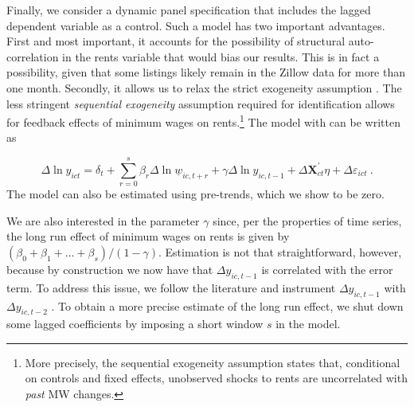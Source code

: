 
Finally, we consider a dynamic panel specification that includes the lagged dependent variable 
as a control. Such a model has two important advantages. First and most important, it accounts 
for the possibility of structural auto-correlation in the rents variable that would bias our results. This 
is in fact a possibility, given that some listings likely remain in the Zillow data for more 
than one month. Secondly, it allows us to relax the strict exogeneity assumption 
\parencite{ArellanoHonore2001}. The less stringent \textit{sequential exogeneity} assumption 
required for identification allows for feedback effects of minimum wages on rents.\footnote{More 
	precisely, the sequential exogeneity assumption states that, conditional on controls and 
	fixed 	effects, unobserved shocks to rents are uncorrelated with \textit{past} MW changes.}
The model with can be written as

\begin{equation}\label{eq:ab_panel}
	\Delta \ln y_{ict} = \delta_t
						+ \sum_{r=0}^{s} \beta_r \Delta \ln \underline{w}_{ic,t+r}
						+ \gamma \Delta \ln y_{ic,t-1} + \Delta \mathbf{X}^{'}_{ct}\eta
						+ \Delta \varepsilon_{ict} \ .
\end{equation}
The model can also be estimated using pre-trends, which we show to be zero.

We are also interested in the parameter $\gamma$ since, per the properties of time series, the 
long run effect of minimum wages on rents is given by $(\beta_0 + \beta_1 + \dots + 
\beta_s)/(1-\gamma)$. Estimation is not that straightforward, however, because by construction 
we now have that $\Delta y_{ic,t-1}$ is correlated with the error term. To address this issue,
we follow the literature and instrument $\Delta y_{ic,t-1}$ with $\Delta y_{ic,t-2}$ 
\parencite{ArellanoHonore2001}. To obtain a more precise estimate of the long run effect, we 
shut down some lagged coefficients by imposing a short window $s$ in the model.

